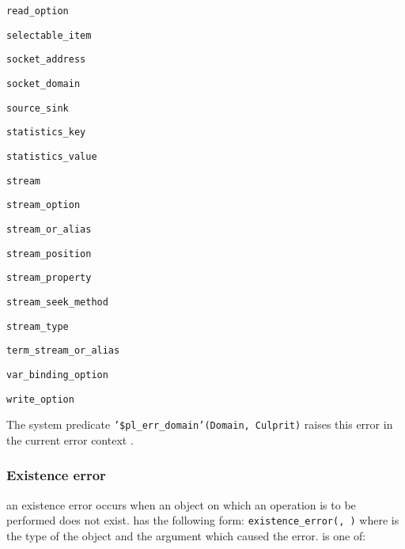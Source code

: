 \begin{ItemizeThreeCols}
\item \texttt{read\_option}

\item \texttt{selectable\_item}

\item \texttt{socket\_address}

\item \texttt{socket\_domain}

\item \texttt{source\_sink}

\item \texttt{statistics\_key}

\item \texttt{statistics\_value}

\item \texttt{stream}

\item \texttt{stream\_option}

\item \texttt{stream\_or\_alias}

\item \texttt{stream\_position}

\item \texttt{stream\_property}

\item \texttt{stream\_seek\_method}

\item \texttt{stream\_type}

\item \texttt{term\_stream\_or\_alias}

\item \texttt{var\_binding\_option}

\item \texttt{write\_option}

\end{ItemizeThreeCols}

The system predicate \texttt{'\$pl\_err\_domain'(Domain, Culprit)} raises
this error in the current error context .

\subsubsection{Existence error}
\label{Existence-error}
an existence error occurs when an object on which an operation is to be
performed does not exist.  has the following
form: \texttt{existence\_error(, )} where
 is the type of the object and
 the argument which caused the error.
 is one of:

